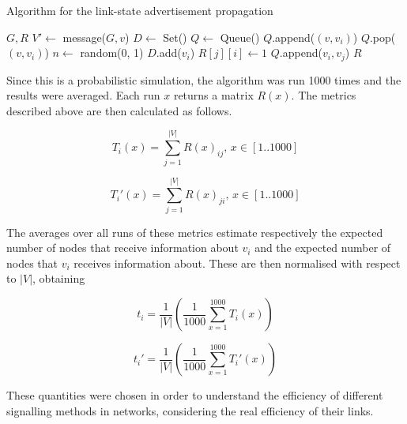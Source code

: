 \documentclass[a4paper,11pt,twoside,openright]{memoir}
\begin{document}
\begin{algorithm}
  \caption{Algorithm for the link-state advertisement propagation}
  \label{alg:mp}
  \begin{algorithmic}
    \REQUIRE $G, R$
      \STATE $V' \leftarrow $ message($G, v$)
      \STATE $D \leftarrow $ Set()
      \STATE $Q \leftarrow $ Queue()
        \STATE $Q$.append($(v, v_i)$)
      \ENDFOR
        \STATE $Q$.pop($(v, v_i)$)
        \STATE $n \leftarrow $ random(0, 1)
          \STATE $D$.add($v_i$)
            \STATE $R[j][i] \leftarrow 1$
          \ENDFOR
              \STATE $Q$.append($v_i, v_j$)
            \ENDFOR
          \ENDIF
        \ENDIF
      \ENDWHILE
    \ENDFOR
    \RETURN $R$
  \end{algorithmic}
\end{algorithm}

Since this is a probabilistic simulation, the algorithm was run 1000
times and the results were averaged. Each run $x$ returns a matrix $R(x)$.
The metrics described above are then calculated as follows.

\begin{equation}
T_i(x) = \sum_{j=1}^{|V|} R(x)_{ij},\, x \in [1..1000]
\end{equation}

\begin{equation}
T_i'(x) = \sum_{j=1}^{|V|} R(x)_{ji},\, x \in [1..1000]
\end{equation}

The averages over all runs of these metrics estimate respectively the
expected number of nodes that receive information about $v_i$ and the
expected number of nodes that $v_i$ receives information about. These
are then normalised with respect to $|V|$, obtaining

\begin{equation}
t_i = \frac{1}{|V|}
      \left( \frac{1}{1000} \sum_{x=1}^{1000} T_i(x) \right)
\end{equation}

\begin{equation}
t_i' = \frac{1}{|V|}
       \left( \frac{1}{1000} \sum_{x=1}^{1000} T_i'(x) \right)
\end{equation}

These quantities were chosen in order to understand the efficiency of
different signalling methods in networks, considering the real
efficiency of their links.
\end{document}
